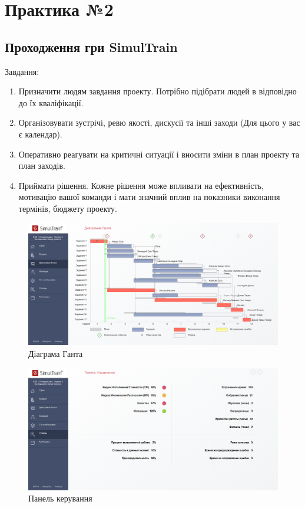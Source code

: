 





\lhead{\small \selectfont \khpistudentgroup}
\chead{\small \selectfont \khpistudentname}

\graphicspath{{figures/}}


\Ukrainian

\section*{Практика №2}
\subsection*{Проходження гри SimulTrain}
Завдання:
\begin{enumerate}
    \item Призначити людям завдання проекту. Потрібно підібрати людей в
відповідно до їх кваліфікації.
    \item Організовувати зустрічі, ревю якості, дискусії та інші заходи (Для цього у вас є календар).
    \item Оперативно реагувати на критичні ситуації і вносити зміни в план проекту та план заходів.
    \item Приймати рішення. Кожне рішення може впливати на ефективність, мотивацію вашої команди і мати значний вплив на показники виконання термінів, бюджету проекту.
\end{enumerate}

\begin{figure}[h]
    \centering
        \includegraphics[width=\textwidth]{scr_gantt}
    \caption{Діаграма Ганта}
\end{figure}

\begin{figure}[h]
    \centering
        \includegraphics[width=\textwidth]{scr_control_panel}
    \caption{Панель керування}
\end{figure}

